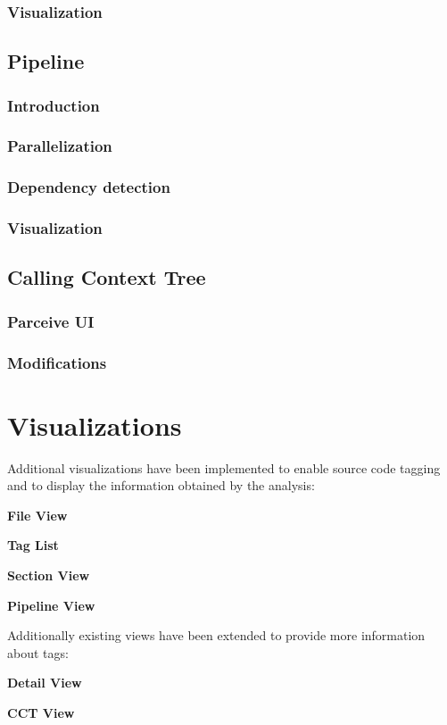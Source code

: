 \subsubsection{Visualization}

\subsection{Pipeline}
\subsubsection{Introduction}
\subsubsection{Parallelization}
\subsubsection{Dependency detection}
\subsubsection{Visualization}

\subsection{Calling Context Tree}
\subsubsection{Parceive UI}
\subsubsection{Modifications}

\section{Visualizations}

Additional visualizations have been implemented to enable source code tagging and to display the information obtained by the analysis:

\textbf{File View}

\textbf{Tag List}

\textbf{Section View}

\textbf{Pipeline View}

Additionally existing views have been extended to provide more information about tags:

\textbf{Detail View}

\textbf{CCT View}






